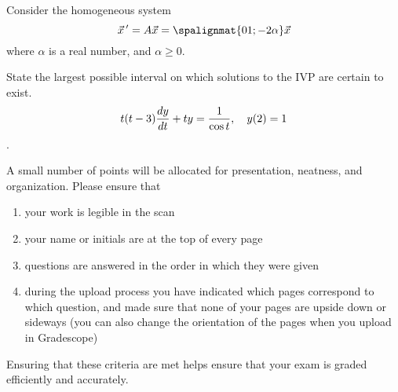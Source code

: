\documentclass[12pt]{exam}
\begin{document}
\begin{questions}
    
    \question[5] %
    Consider the homogeneous system $$\displaystyle \vec x \, ' = A \vec x = \spalignmat{0 1;-2 \alpha}\vec x$$ where $\alpha$ is a real number, and $\alpha \ge 0$.
    

    \newpage \InitialsLeft
    
    \question[2] %
    State the largest possible interval on which solutions to the IVP are certain to exist. $$t(t-3) {\frac{dy}{dt}} + t y = \frac{1}{\cos t}, \quad y(2) = 1$$.
    \vspace{5cm}
    

    

    \question[2] A small number of points will be allocated for presentation, neatness, and organization. Please ensure that
    \begin{enumerate}
        \item your work is legible in the scan
        \item your name or initials are at the top of every page
        \item questions are answered in the order in which they were given
        \item during the upload process you have indicated which pages correspond to which question, and made sure that none of your pages are upside down or sideways (you can also change the orientation of the pages when you upload in Gradescope)
    \end{enumerate}
    Ensuring that these criteria are met helps ensure that your exam is graded efficiently and accurately. 
    


    
\end{questions}
    
\end{document}

